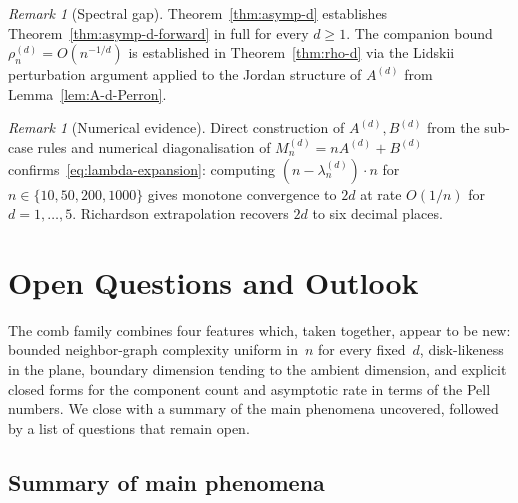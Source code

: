 \documentclass{amsart}
\theoremstyle{definition}
\theoremstyle{remark}
\newtheorem{remark}[theorem]{Remark}
\begin{document}
\begin{remark}[Spectral gap]
Theorem~\ref{thm:asymp-d} establishes
Theorem~\ref{thm:asymp-d-forward} in full for every $d \ge 1$.
The companion bound $\rho_n^{(d)} = O(n^{-1/d})$ is established
in Theorem~\ref{thm:rho-d} via the Lidskii
perturbation argument applied to the Jordan structure of
$A^{(d)}$ from Lemma~\ref{lem:A-d-Perron}.
\end{remark}

\begin{remark}[Numerical evidence]
\label{rem:numerics-asymp}
Direct construction of $A^{(d)}, B^{(d)}$ from the sub-case rules
and numerical diagonalisation of $M_n^{(d)} = n A^{(d)} + B^{(d)}$
confirms~\eqref{eq:lambda-expansion}: computing
$(n - \lambda_n^{(d)}) \cdot n$ for $n \in \{10, 50, 200, 1000\}$
gives monotone convergence to $2d$ at rate $O(1/n)$ for
$d = 1, \ldots, 5$.  Richardson extrapolation recovers
$2d$ to six decimal places.
\end{remark}


\section{Open Questions and Outlook}
\label{sec:discussion}

The comb family combines four features which, taken together,
appear to be new: bounded neighbor-graph complexity uniform
in~$n$ for every fixed~$d$, disk-likeness in the plane, boundary
dimension tending to the ambient dimension, and explicit closed
forms for the component count and asymptotic rate in terms of
the Pell numbers.  We close with a summary of the main phenomena
uncovered, followed by a list of questions that remain open.

\subsection*{Summary of main phenomena}
\end{document}
